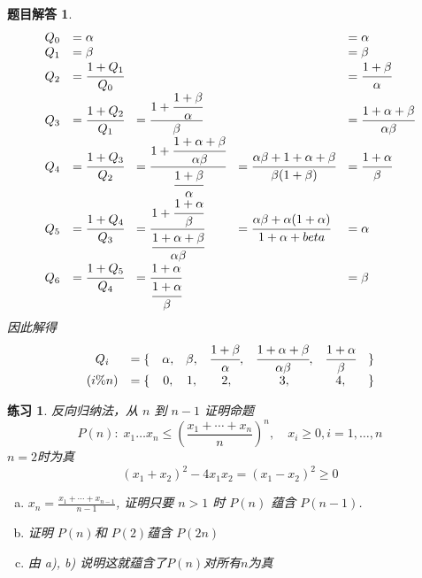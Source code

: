 \documentclass[mode=geye]{elegantnote}
\newtheorem{exercise}{练习}
\newtheorem{answer}{题目解答}
\begin{document}
\begin{answer}
	\begin{equation*}
		\begin{array}{lllll}
			Q_0 &= \alpha & & &= \alpha\\
			Q_1 &= \beta  & & &= \beta\\
			Q_2 &= \cfrac{1+Q_1}{Q_0} & &&= \cfrac{1+\beta}{\alpha} \\
			Q_3 &= \cfrac{1+Q_2}{Q_1} &= \cfrac{1+\cfrac{1+\beta}{\alpha}}{\beta} 
			&&= \cfrac{1+\alpha+\beta}{\alpha\beta} \\
			Q_4 &= \cfrac{1+Q_3}{Q_2} 
			&= \cfrac{1+\cfrac{1+\alpha+\beta}{\alpha\beta} }{\cfrac{1+\beta}{\alpha}}
			&= \cfrac{\alpha\beta+1+\alpha+\beta}{\beta(1+\beta)} 
			&= \cfrac{1+\alpha}{\beta} \\
			Q_5 &= \cfrac{1+Q_4}{Q_3} 
			&= \cfrac{1+\cfrac{1+\alpha}{\beta}}{ \cfrac{1+\alpha+\beta}{\alpha\beta}}
			&= \cfrac{\alpha\beta+\alpha(1+\alpha)}{1+\alpha+beta} &= \alpha \\
			Q_6 &= \cfrac{1+Q_5}{Q_4} &= \cfrac{1+\alpha}{\cfrac{1+\alpha}{\beta}} & &= \beta\\
		\end{array}
	\end{equation*}
	因此解得 
	\begin{equation*}
		\begin{array}{clcccccc}
			Q_i &= \{ &\alpha ,& \beta ,& \cfrac{1+\beta}{\alpha} ,& \cfrac{1+\alpha+\beta}{\alpha\beta} ,& \cfrac{1+\alpha}{\beta} & \}\\
			(i\%n) &= \{ & 0 ,& 1 ,& 2 ,& 3 ,& 4 ,& \}\\
		\end{array}
	\end{equation*}
\end{answer}	

\begin{exercise}
		反向归纳法，从 $ n $ 到 $  n-1 $ 证明命题
	\begin{equation*}
		P(n) : \; x_{1} \dots x_{n} \leqslant \left( \frac{x_{1}+\cdots+x_{n}}{n}\right) ^n, \quad x_i \geqslant 0, i=1,\dots,n
	\end{equation*}
	$ n=2 $时为真 
	\begin{equation*}
		(x_{1}+x_{2})^2-4x_{1}x_{2} = (x_{1}-x_{2})^2 \geqslant 0
	\end{equation*}
	\begin{enumerate}[a)]
		\item $ x_n = \frac{x_{1}+\cdots+x_{n-1}}{n-1} $, 证明只要 $ n>1 $ 时 $ P(n) $ 蕴含 $ P(n-1) $.
		\item 证明 $ P(n) $和 $ P(2) $蕴含 $ P(2n) $
		\item 由 a), b) 说明这就蕴含了$ P(n) $对所有$ n $为真
	\end{enumerate}
\end{exercise}
\end{document}
